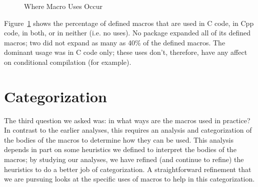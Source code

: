 \documentclass[11pt]{article}
\begin{document}
\begin{figure}
\centerline{}
\caption{Where Macro Uses Occur}
\label{fig:define_usage}
\end{figure}

Figure~\ref{fig:define_usage} shows the percentage of defined macros
that are used in C code, in Cpp code, in both, or in neither (i.e. no
uses).  No package expanded all of its defined macros; two did not
expand as many as 40\% of the defined macros.  The dominant usage was
in C code only; these uses don't, therefore, have any affect on
conditional compilation (for example).  


\section{Categorization}
\label{sec:categorization}

The third question we asked was: in what ways are the macros used in
practice?  In contrast to the earlier analyses, this requires an
analysis and categorization of the bodies of the macros to determine
how they can be used.  This analysis depends in part on some
heuristics we defined to interpret the bodies of the macros; by
studying our analyses, we have refined (and continue to refine) the
heuristics to do a better job of categorization.  A straightforward
refinement that we are pursuing looks at the specific uses of macros
to help in this categorization.
\end{document}
